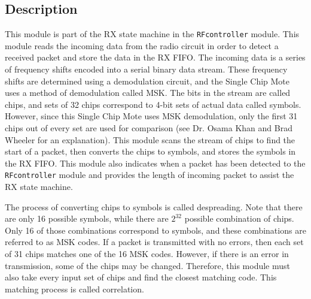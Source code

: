 \subsection{Description}
This module is part of the RX state machine in the \texttt{RFcontroller} module. This module reads the incoming data from the radio circuit in order to detect a received packet and store the data in the RX FIFO. The incoming data is a series of frequency shifts encoded into a serial binary data stream. These frequency shifts are determined using a demodulation circuit, and the Single Chip Mote uses a method of demodulation called MSK. The bits in the stream are called chips, and sets of 32 chips correspond to 4-bit sets of actual data called symbols. However, since this Single Chip Mote uses MSK demodulation, only the first 31 chips out of every set are used for comparison (see Dr. Osama Khan and Brad Wheeler for an explanation). This module scans the stream of chips to find the start of a packet, then converts the chips to symbols, and stores the symbols in the RX FIFO. This module also indicates when a packet has been detected to the \texttt{RFcontroller} module and provides the length of incoming packet to assist the RX state machine.

The process of converting chips to symbols is called despreading. Note that there are only 16 possible symbols, while there are $2^{32}$ possible combination of chips. Only 16 of those combinations correspond to symbols, and these combinations are referred to as MSK codes. If a packet is transmitted with no errors, then each set of 31 chips matches one of the 16 MSK codes. However, if there is an error in transmission, some of the chips may be changed. Therefore, this module must also take every input set of chips and find the closest matching code. This matching process is called correlation.

